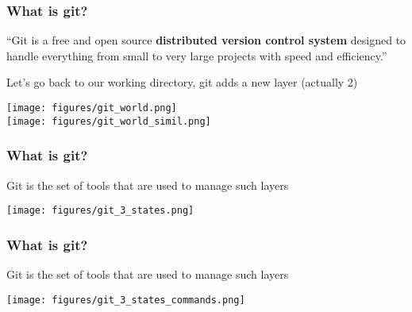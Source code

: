 \documentclass[xcolor=dvipsnames,10pt]{beamer}
\begin{document}
\begin{frame}
 \frametitle{What is git?}
 
 \begin{minipage}{1.0\textwidth}
  ``Git is a free and open source \textbf{distributed version control system} designed to handle everything from small to very large projects with speed and efficiency.''
 \end{minipage}
 \vspace*{0.4cm}
 
 Let's go back to our working directory, git adds a new layer (actually 2)
 
 \begin{center}
 \texttt{[image: figures/git\_world.png]}\\
 \texttt{[image: figures/git\_world\_simil.png]}  
 \end{center}
 
\end{frame}

\begin{frame}
 \frametitle{What is git?}
 
 Git is the set of tools that are used to manage such layers
  \vspace*{0.4cm}
 
 \begin{center}
 \texttt{[image: figures/git\_3\_states.png]}
 \end{center}
 
\end{frame}
\addtocounter{framenumber}{-1}
\begin{frame}
 \frametitle{What is git?}
 
 Git is the set of tools that are used to manage such layers
  \vspace*{0.4cm}
 
 \begin{center}
 \texttt{[image: figures/git\_3\_states\_commands.png]}
 \end{center}
 
\end{frame}
\end{document}
